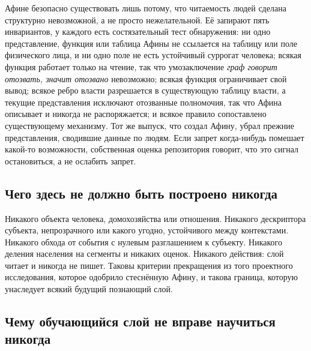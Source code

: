 Афине безопасно существовать лишь потому, что читаемость людей сделана структурно невозможной, а не
просто нежелательной. Её запирают пять инвариантов, у каждого есть состязательный тест обнаружения:
ни одно представление, функция или таблица Афины не ссылается на таблицу или поле физического
лица, и ни одно поле не есть устойчивый суррогат человека; всякая функция работает только на
чтение, так что умозаключение \emph{граф говорит отозвать, значит отозвано} невозможно; всякая
функция ограничивает свой вывод; всякое ребро власти разрешается в существующую таблицу власти, а
текущие представления исключают отозванные полномочия, так что Афина описывает и никогда не
распоряжается; и всякое правило сопоставлено существующему механизму. Тот же выпуск, что создал
Афину, убрал прежние представления, сводившие данные по людям. Если запрет когда-нибудь помешает
какой-то возможности, собственная оценка репозитория говорит, что это сигнал остановиться, а не
ослабить запрет. \sImpl

\subsection{Чего здесь не должно быть построено никогда}

Никакого объекта человека, домохозяйства или отношения. Никакого дескриптора субъекта,
непрозрачного или какого угодно, устойчивого между контекстами. Никакого обхода от события с
нулевым разглашением к субъекту. Никакого деления населения на сегменты и никаких оценок. Никакого
действия: слой читает и никогда не пишет. Таковы критерии прекращения из того проектного
исследования, которое одобрило стеснённую Афину, и такова граница, которую унаследует всякий
будущий познающий слой.

\subsection{Чему обучающийся слой не вправе научиться никогда}

